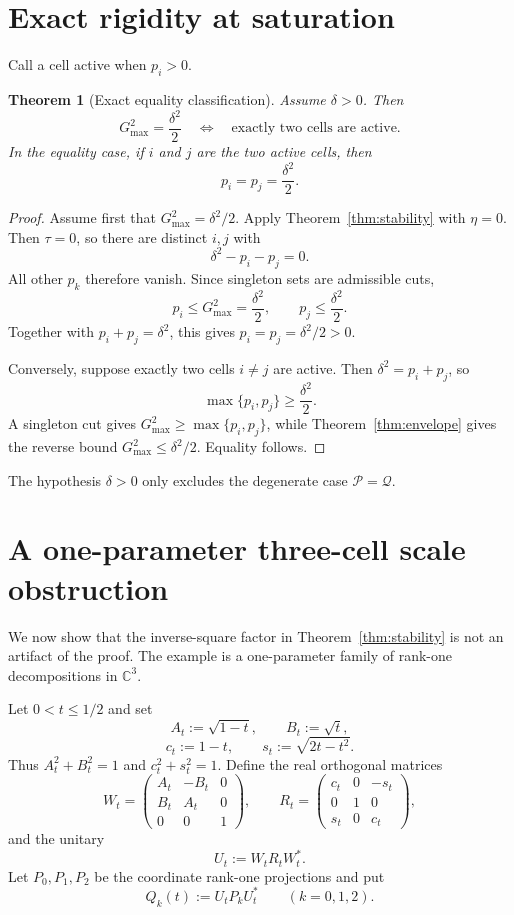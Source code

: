 \documentclass[11pt]{article}
\newtheorem{theorem}{Theorem}[section]
\newcommand{\C}{\mathbb{C}}
\newcommand{\gmax}{G_{\max}}
\newcommand{\dd}{\delta}
\begin{document}
\section{Exact rigidity at saturation}\label{sec:rigidity}

Call a cell active when $p_i>0$.

\begin{theorem}[Exact equality classification]\label{thm:rigidity}
Assume $\dd>0$.  Then
\[
  \boxed{
  \gmax^2=\frac{\dd^2}{2}
  \quad\Longleftrightarrow\quad
  \text{exactly two cells are active}.
  }
\]
In the equality case, if $i$ and $j$ are the two active cells, then
\[
  p_i=p_j=\frac{\dd^2}{2}.
\]
\end{theorem}

\begin{proof}
Assume first that $\gmax^2=\dd^2/2$.  Apply
Theorem~\ref{thm:stability} with $\eta=0$.  Then $\tau=0$, so there are
distinct $i,j$ with
\[
  \dd^2-p_i-p_j=0.
\]
All other $p_k$ therefore vanish.  Since singleton sets are admissible cuts,
\[
  p_i\le\gmax^2=\frac{\dd^2}{2},
  \qquad
  p_j\le\frac{\dd^2}{2}.
\]
Together with $p_i+p_j=\dd^2$, this gives
$p_i=p_j=\dd^2/2>0$.

Conversely, suppose exactly two cells $i\ne j$ are active.  Then
$\dd^2=p_i+p_j$, so
\[
  \max\{p_i,p_j\}\ge\frac{\dd^2}{2}.
\]
A singleton cut gives
$\gmax^2\ge\max\{p_i,p_j\}$, while
Theorem~\ref{thm:envelope} gives the reverse bound
$\gmax^2\le\dd^2/2$.  Equality follows.
\end{proof}

The hypothesis $\dd>0$ only excludes the degenerate case
$\mathcal P=\mathcal Q$.

\section{A one-parameter three-cell scale obstruction}\label{sec:sharp}

We now show that the inverse-square factor in
Theorem~\ref{thm:stability} is not an artifact of the proof.  The example is
a one-parameter family of rank-one decompositions in $\C^3$.

Let $0<t\le1/2$ and set
\[
  A_t:=\sqrt{1-t},
  \qquad
  B_t:=\sqrt t,
\]
\[
  c_t:=1-t,
  \qquad
  s_t:=\sqrt{2t-t^2}.
\]
Thus $A_t^2+B_t^2=1$ and $c_t^2+s_t^2=1$.  Define the real orthogonal
matrices
\[
  W_t=
  \begin{pmatrix}
    A_t&-B_t&0\\
    B_t&A_t&0\\
    0&0&1
  \end{pmatrix},
  \qquad
  R_t=
  \begin{pmatrix}
    c_t&0&-s_t\\
    0&1&0\\
    s_t&0&c_t
  \end{pmatrix},
\]
and the unitary
\[
  U_t:=W_tR_tW_t^*.
\]
Let $P_0,P_1,P_2$ be the coordinate rank-one projections and put
\[
  Q_k(t):=U_tP_kU_t^*
  \qquad(k=0,1,2).
\]
\end{document}
